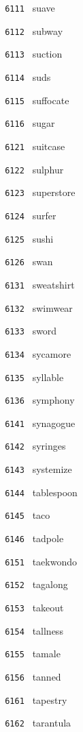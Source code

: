 \documentclass[11pt]{article}
\begin{document}
\begin{multicols}{6}
\small
\noindent \texttt{ 6111 } suave  \par
\noindent \texttt{ 6112 } subway  \par
\noindent \texttt{ 6113 } suction  \par
\noindent \texttt{ 6114 } suds  \par
\noindent \texttt{ 6115 } suffocate  \par
\noindent \texttt{ 6116 } sugar  \par
\noindent \texttt{ 6121 } suitcase  \par
\noindent \texttt{ 6122 } sulphur  \par
\noindent \texttt{ 6123 } superstore  \par
\noindent \texttt{ 6124 } surfer  \par
\noindent \texttt{ 6125 } sushi  \par
\noindent \texttt{ 6126 } swan  \par
\noindent \texttt{ 6131 } sweatshirt  \par
\noindent \texttt{ 6132 } swimwear  \par
\noindent \texttt{ 6133 } sword  \par
\noindent \texttt{ 6134 } sycamore  \par
\noindent \texttt{ 6135 } syllable  \par
\noindent \texttt{ 6136 } symphony  \par
\noindent \texttt{ 6141 } synagogue  \par
\noindent \texttt{ 6142 } syringes  \par
\noindent \texttt{ 6143 } systemize  \par
\noindent \texttt{ 6144 } tablespoon  \par
\noindent \texttt{ 6145 } taco  \par
\noindent \texttt{ 6146 } tadpole  \par
\noindent \texttt{ 6151 } taekwondo  \par
\noindent \texttt{ 6152 } tagalong  \par
\noindent \texttt{ 6153 } takeout  \par
\noindent \texttt{ 6154 } tallness  \par
\noindent \texttt{ 6155 } tamale  \par
\noindent \texttt{ 6156 } tanned  \par
\noindent \texttt{ 6161 } tapestry  \par
\noindent \texttt{ 6162 } tarantula  \par

\end{multicols}
\end{document}
